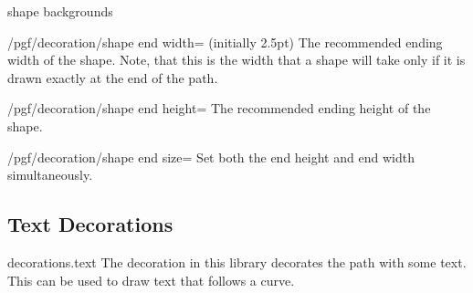 \begin{decoration}{shape backgrounds}
  \begin{key}{/pgf/decoration/shape end width= (initially 2.5pt)}
    The recommended ending width of the shape. Note, that this is the
    width that a shape will take only if it is drawn exactly at the end
    of the path.


\begin{codeexample}[]
\end{codeexample}
  \end{key}%

  \begin{key}{/pgf/decoration/shape end height=}
    The recommended ending height of the shape.
  \end{key}%

  \begin{stylekey}{/pgf/decoration/shape end size=}
    Set both the end height and end width simultaneously.
  \end{stylekey}
\end{decoration}





\subsection{Text Decorations}

\begin{pgflibrary}{decorations.text}
  The decoration in this library decorates the path with some
  text. This can be used to draw text that follows a curve.
\end{pgflibrary}

